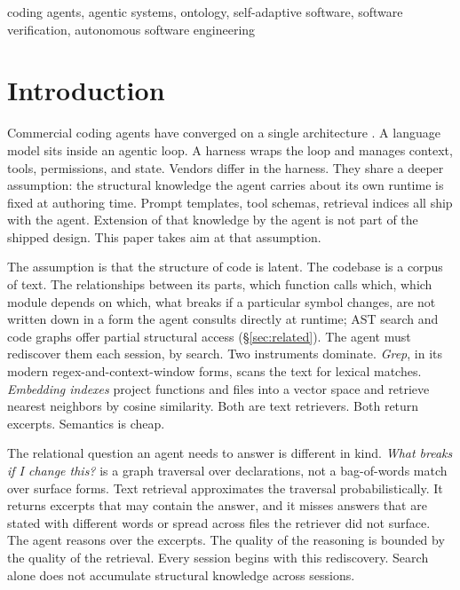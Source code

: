 \documentclass[conference,10pt]{IEEEtran}
\begin{document}
\begin{IEEEkeywords}
coding agents, agentic systems, ontology, self-adaptive software, software verification, autonomous software engineering
\end{IEEEkeywords}

\section{Introduction}\label{sec:intro}

Commercial coding agents have converged on a single architecture \cite{agarwal2026,he2026cursor}. A
language model sits inside an agentic loop. A harness wraps the loop and
manages context, tools, permissions, and state. Vendors differ in the
harness. They share a deeper assumption: the structural knowledge the
agent carries about its own runtime is fixed at authoring time. Prompt
templates, tool schemas, retrieval indices all ship with the agent.
Extension of that knowledge by the agent is not part of the shipped design. This paper takes aim at that assumption.

The assumption is that the structure of code is latent. The codebase is
a corpus of text. The relationships between its parts, which function
calls which, which module depends on which, what breaks if a particular
symbol changes, are not written down in a form the agent consults
directly at runtime; AST search and code graphs offer partial
structural access (§\ref{sec:related}). The agent must rediscover them each session, by search. Two
instruments dominate. \emph{Grep}, in its modern regex-and-context-window
forms, scans the text for lexical matches. \emph{Embedding indexes} project
functions and files into a vector space and retrieve nearest neighbors
by cosine similarity. Both are text retrievers. Both return excerpts.
Semantics is cheap.

The relational question an agent needs to answer is different in kind.
\emph{What breaks if I change this?} is a graph traversal over declarations,
not a bag-of-words match over surface forms. Text retrieval approximates
the traversal probabilistically. It returns excerpts that may contain the
answer, and it misses answers that are stated with different words
or spread across files the retriever did not surface. The agent reasons
over the excerpts. The quality of the reasoning is bounded by the
quality of the retrieval. Every session begins with this rediscovery.
Search alone does not accumulate structural knowledge across sessions.
\end{document}
